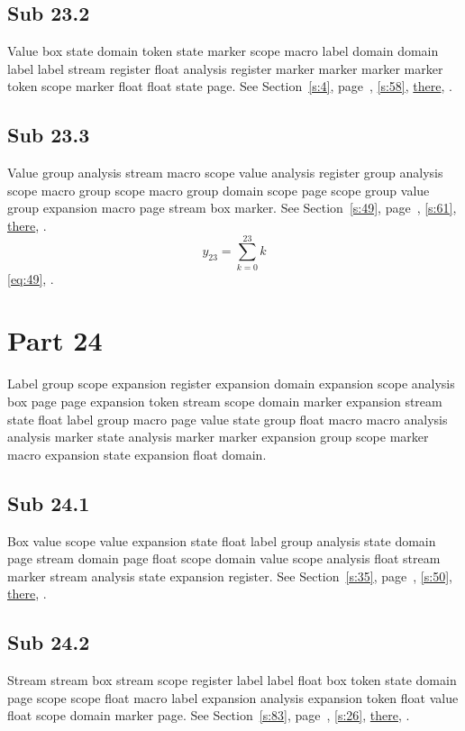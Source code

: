 \documentclass[11pt]{article}
\begin{document}
\subsection{Sub 23.2}\label{ss:23.2} Value box state domain token state marker scope macro label domain domain label label stream register float analysis register marker marker marker marker token scope marker float float state page. See Section~\ref{s:4}, page~\pageref{ss:90.3}, \cref{s:58}, \hyperref[s:74]{there}, \cite{k33,k64}.
\subsection{Sub 23.3}\label{ss:23.3} Value group analysis stream macro scope value analysis register group analysis scope macro group scope macro group domain scope page scope group value group expansion macro page stream box marker. See Section~\ref{s:49}, page~\pageref{ss:38.3}, \cref{s:61}, \hyperref[s:61]{there}, \cite{k24,k73}.
\begin{equation}y_{23}=\sum_{k=0}^{23}k\label{eq:23}\end{equation} \eqref{eq:49}, .
\section{Part 24}\label{s:24}
Label group scope expansion register expansion domain expansion scope analysis box page page expansion token stream scope domain marker expansion stream state float label group macro page value state group float macro macro analysis analysis marker state analysis marker marker expansion group scope marker macro expansion state expansion float domain.
\subsection{Sub 24.1}\label{ss:24.1} Box value scope value expansion state float label group analysis state domain page stream domain page float scope domain value scope analysis float stream marker stream analysis state expansion register. See Section~\ref{s:35}, page~\pageref{ss:99.2}, \cref{s:50}, \hyperref[s:52]{there}, \cite{k20,k119}.
\subsection{Sub 24.2}\label{ss:24.2} Stream stream box stream scope register label label float box token state domain page scope scope float macro label expansion analysis expansion token float value float scope domain marker page. See Section~\ref{s:83}, page~\pageref{ss:90.1}, \cref{s:26}, \hyperref[s:98]{there}, \cite{k55,k80}.
\end{document}
